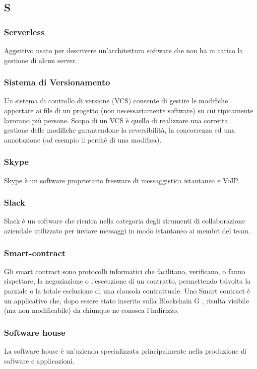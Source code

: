 \subsection*{\textbf{\hfill \Huge{S} \hfill}} 
\subsubsection*{Serverless}
Aggettivo usato per descrivere un’architettura software che non ha in carico la gestione di alcun server.
\subsubsection*{Sistema di Versionamento}
Un sistema di controllo di versione (VCS) consente di gestire le modifiche apportate ai file di un progetto (non necessariamente software) su cui tipicamente lavorano più persone. Scopo di un VCS è quello di realizzare una corretta gestione delle modifiche garantendone la reversibilità, la concorrenza ed una annotazione (ad esempio il perché di una modifica).
\subsubsection*{Skype}
Skype è un software proprietario freeware di messaggistica istantanea e VoIP.
\subsubsection*{Slack}
Slack è un software che rientra nella categoria degli strumenti di collaborazione aziendale utilizzato per inviare messaggi in modo istantaneo ai membri del team.
\subsubsection*{Smart-contract}
Gli smart contract sono protocolli informatici che facilitano, verificano, o fanno rispettare, la negoziazione o l’esecuzione di un contratto, permettendo talvolta la parziale o la totale esclusione di una clausola contrattuale. Uno Smart contract è un applicativo che, dopo essere stato inserito sulla Blockchain G , risulta visibile (ma non modificabile) da chiunque ne conosca l’indirizzo.
\subsubsection*{Software house}
La software house è un'azienda specializzata principalmente nella produzione di software e applicazioni.
